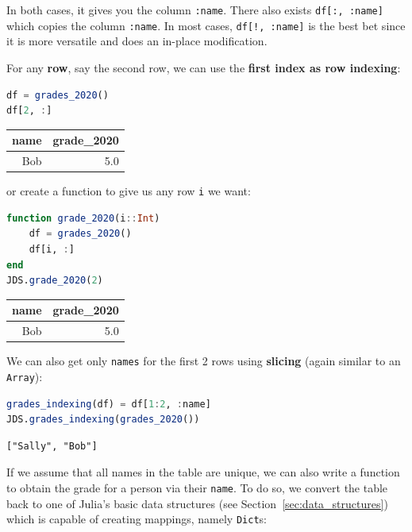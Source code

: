 \documentclass[
  notoc %
]{tufte-book}
\newcommand{\passthrough}[1]{#1}
\begin{document}
In both cases, it gives you the column \passthrough{\lstinline!:name!}.
There also exists \passthrough{\lstinline!df[:, :name]!} which copies
the column \passthrough{\lstinline!:name!}. In most cases,
\passthrough{\lstinline"df[!, :name]"} is the best bet since it is more
versatile and does an in-place modification.

For any \textbf{row}, say the second row, we can use the \textbf{first
index as row indexing}:

\begin{lstlisting}[language=Julia]
df = grades_2020()
df[2, :]
\end{lstlisting}

\begin{longtable}[]{@{}rr@{}}
\toprule
name & grade\_2020 \\
\midrule
\endhead
Bob & 5.0 \\
\bottomrule
\end{longtable}

or create a function to give us any row \passthrough{\lstinline!i!} we
want:

\begin{lstlisting}[language=Julia]
function grade_2020(i::Int)
    df = grades_2020()
    df[i, :]
end
JDS.grade_2020(2)
\end{lstlisting}

\begin{longtable}[]{@{}rr@{}}
\toprule
name & grade\_2020 \\
\midrule
\endhead
Bob & 5.0 \\
\bottomrule
\end{longtable}

We can also get only \passthrough{\lstinline!names!} for the first 2
rows using \textbf{slicing} (again similar to an
\passthrough{\lstinline!Array!}):

\begin{lstlisting}[language=Julia]
grades_indexing(df) = df[1:2, :name]
JDS.grades_indexing(grades_2020())
\end{lstlisting}

\begin{lstlisting}[language=Output]
["Sally", "Bob"]
\end{lstlisting}

If we assume that all names in the table are unique, we can also write a
function to obtain the grade for a person via their
\passthrough{\lstinline!name!}. To do so, we convert the table back to
one of Julia's basic data structures (see
Section~\ref{sec:data_structures}) which is capable of creating
mappings, namely \passthrough{\lstinline!Dict!}s:
\end{document}
